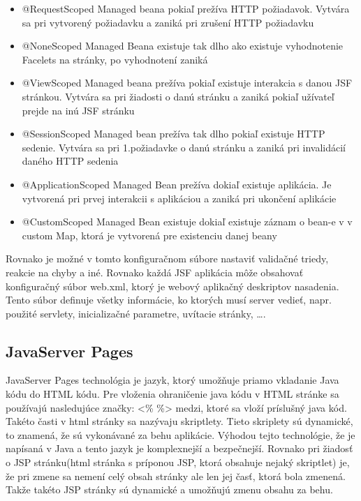 \begin{itemize}
\item @RequestScoped Managed beana pokiaľ prežíva HTTP požiadavok. Vytvára sa pri vytvorený požiadavku a zaniká pri zrušení HTTP požiadavku
\item @NoneScoped Managed Beana existuje tak dlho ako existuje vyhodnotenie Facelets na stránky, po vyhodnotení zaniká
\item @ViewScoped Managed beana prežíva pokiaľ existuje interakcia s danou JSF stránkou. Vytvára sa pri žiadosti o danú stránku a zaniká pokiaľ užívateľ prejde na inú JSF stránku
\item @SessionScoped Managed bean prežíva tak dlho pokiaľ existuje HTTP sedenie. Vytvára sa pri 1.požiadavke o danú stránku a zaniká pri invalidácií daného HTTP sedenia
\item @ApplicationScoped Managed Bean prežíva dokiaľ existuje aplikácia. Je vytvorená pri prvej interakcii s aplikáciou a zaniká pri ukončení aplikácie
\item @CustomScoped Managed Bean existuje dokiaľ existuje záznam o bean-e v v custom Map, ktorá je vytvorená pre existenciu danej beany
\end{itemize}
Rovnako je možné v tomto konfiguračnom súbore nastaviť validačné triedy, reakcie na chyby a iné. Rovnako každá JSF aplikácia môže obsahovať konfiguračný súbor web.xml, ktorý je webový aplikačný deskriptov nasadenia. Tento súbor definuje všetky informácie, ko ktorých musí server vedieť, napr. použité servlety, inicializačné parametre, uvítacie stránky, \ldots.
\subsection{JavaServer Pages}
JavaServer Pages technológia je jazyk, ktorý umožňuje priamo vkladanie Java kódu do HTML kódu. Pre vloženia ohraničenie java kódu v HTML stránke sa používajú nasledujúce značky: <\% \%> medzi, ktoré sa vloží príslušný java kód. Takéto časti v html stránky sa nazývaju skriptlety. Tieto skriplety sú dynamické, to znamená, že sú vykonávané za behu aplikácie. Výhodou tejto technológie, že je napísaná v Java a tento jazyk je komplexnejší a bezpečnejší. Rovnako pri žiadosť o JSP stránku(html stránka s príponou JSP, ktorá obsahuje nejaký skriptlet) je, že pri zmene sa nemení celý obsah stránky ale len jej časť, ktorá bola zmenená. Takže takéto JSP stránky sú dynamické a umožňujú zmenu obsahu za behu.

